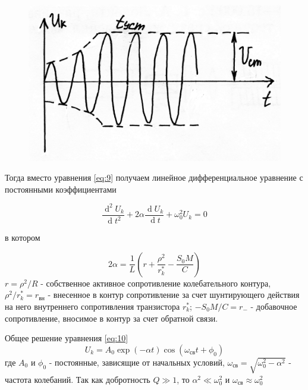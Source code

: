 \begin{figure}
\includegraphics[width=\linewidth]{circuit/fig13}
\caption{}
\label{fig:figure13}
\vspace{-20pt}
\end{figure}

Тогда вместо уравнения \eqref{eq:9} получаем линейное дифференциальное уравнение с постоянными коэффициентами

\begin{equation}
\frac{\operatorname d^2U_k}{\operatorname dt^2}+2\alpha \frac{\operatorname d U_k}{\operatorname dt}+\omega_0^2U_k=0
\label{eq:10}
\end{equation}

в котором

\begin{equation}
2\alpha=\frac{1}{L}(r+\frac{\rho^2}{r_k^*}-\frac{S_0M}{C})
\label{eq:11}
\end{equation}
$\displaystyle r=\rho^2/R$ - собственное активное сопротивление колебательного контура, $\displaystyle \rho^2/r_k^*=r_\text{вн}$ - внесенное в контур сопротивление за счет шунтирующего действия на него внутреннего сопротивления транзистора $r_k^*$; $-S_0M/C=r_{-}$ - добавочное сопротивление, вносимое в контур за счет обратной связи. 

Общее решение уравнения \eqref{eq:10}
\begin{equation*}
U_k=A_0\exp(-\alpha t)\cos(\omega_\text{св}t+\phi_0)
\end{equation*}
где $A_0$ и $\phi_0$ - постоянные, зависящие от начальных условий, $\omega_\text{св}=\sqrt{\omega_0^2-\alpha^2}$ - частота колебаний. Так как добротность $Q\gg1$, то $\alpha^2\ll \omega_0^2$ и $\omega_\text{св}\approx\omega_0^2$

